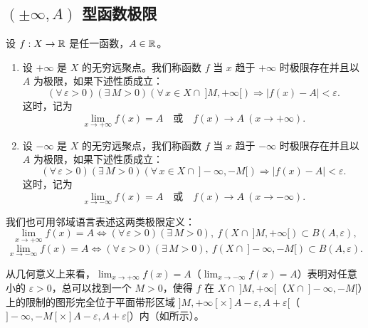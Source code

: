 \subsection{\texorpdfstring{\((\pm\infty,A)\) 型函数极限}{（正负无穷, A）型函数极限}}

\begin{mydef*}{}

	设 \(f:X\to\mathbb{R}\) 是任一函数，\(A\in\mathbb{R}\)。

	\begin{enumerate}[label=\arabic*)]
		\item 设 \(+\infty\) 是 \(X\) 的无穷远聚点。我们称函数 \(f\) 当 \(x\) 趋于 \(+\infty\) 时极限存在并且以 \(A\) 为极限，如果下述性质成立：
		\[
		(\forall\,\varepsilon>0)(\exists\,M>0)(\forall\,x\in X\cap\ ]M,+\infty[)\Longrightarrow |f(x)-A|<\varepsilon.
		\]
		这时，记为
		\[
		\lim_{x\to+\infty}f(x)=A \quad\text{或}\quad f(x)\to A\ (x\to+\infty).
		\]

		\item 设 \(-\infty\) 是 \(X\) 的无穷远聚点，我们称函数 \(f\) 当 \(x\) 趋于 \(-\infty\) 时极限存在并且以 \(A\) 为极限，如果下述性质成立：
		\[
		(\forall\,\varepsilon>0)(\exists\,M>0)(\forall\,x\in X\cap\ ]-\infty,-M[)\Longrightarrow |f(x)-A|<\varepsilon.
		\]
		这时，记为
		\[
		\lim_{x\to-\infty}f(x)=A \quad\text{或}\quad f(x)\to A\ (x\to-\infty).
		\]
	\end{enumerate}

\end{mydef*}

我们也可用邻域语言表述这两类极限定义：
\[
\lim_{x\to+\infty}f(x)=A \Longleftrightarrow (\forall\,\varepsilon>0)(\exists\,M>0),\ f(X\cap\ ]M,+\infty[)\subset B(A,\varepsilon),
\]
\[
\lim_{x\to-\infty}f(x)=A \Longleftrightarrow (\forall\,\varepsilon>0)(\exists\,M>0),\ f(X\cap\ ]-\infty,-M[)\subset B(A,\varepsilon).
\]

从几何意义上来看，\(\lim_{x\to+\infty}f(x)=A\)（\(\lim_{x\to-\infty}f(x)=A\)）表明对任意小的 \(\varepsilon>0\)，总可以找到一个 \(M>0\)，使得 \(f\) 在 \(X\cap\ ]M,+\infty[\)（\(X\cap\ ]-\infty,-M[\)）上的限制的图形完全位于平面带形区域 \(]M,+\infty[\times]A-\varepsilon,A+\varepsilon[\)（\(]-\infty,-M[\times]A-\varepsilon,A+\varepsilon[\)）内（如所示）。

